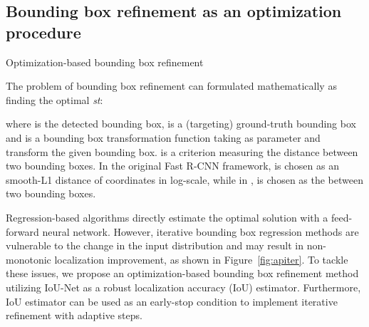 \documentclass[runningheads]{llncs}
\begin{document}
 \subsection{Bounding box refinement as an optimization procedure}
\label{sec:refinement}

\begin{algorithm}[!t]
\caption{Optimization-based bounding box refinement}
\label{alg:bbrefine}
\begin{algorithmic}[1]
\State{}
\For{}
        \State{}
        \State{}
        \State{}
        \State{}
            \State{}
        \EndIf
    \EndFor
\EndFor
\State{\Return{}}
\end{algorithmic}
\end{algorithm}


The problem of bounding box refinement can formulated mathematically as finding the optimal  \emph{st}:

where  is the detected bounding box,  is a (targeting) ground-truth bounding box and  is a bounding box transformation function taking  as parameter and transform the given bounding box.  is a criterion measuring the distance between two bounding boxes. In the original Fast R-CNN \cite{dollar2014fast} framework,  is chosen as an smooth-L1 distance of coordinates in log-scale, while in \cite{yu2016unitbox},  is chosen as the  between two bounding boxes.

Regression-based algorithms directly estimate the optimal solution  with a feed-forward neural network. However, iterative bounding box regression methods are vulnerable to the change in the input distribution \cite{cai2017cascade} and may result in non-monotonic localization improvement, as shown in Figure~\ref{fig:apiter}.
To tackle these issues, we propose an optimization-based bounding box refinement method utilizing IoU-Net as a robust localization accuracy (IoU) estimator. Furthermore, IoU estimator can be used as an early-stop condition to implement iterative refinement with adaptive steps.
\end{document}

